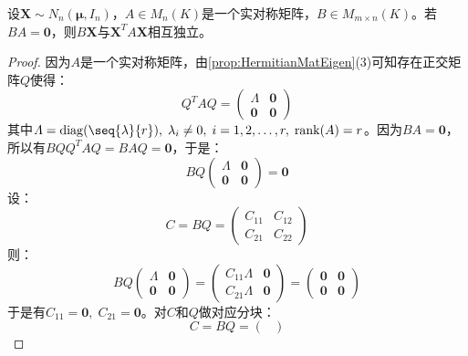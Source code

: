 \begin{theorem}\label{theo:BXXAXIndependent}
	设$\mathbf{X}\sim N_n(\boldsymbol{\mu},I_n)$，$A\in M_{n}(K)$是一个实对称矩阵，$B\in M_{m\times n}(K)$。若$BA=\mathbf{0}$，则$B\mathbf{X}$与$\mathbf{X}^TA\mathbf{X}$相互独立。
\end{theorem}
\begin{proof}
	因为$A$是一个实对称矩阵，由\cref{prop:HermitianMatEigen}(3)可知存在正交矩阵$Q$使得：
	\begin{equation*}
		Q^TAQ=
		\begin{pmatrix}
			\varLambda & \mathbf{0} \\
			\mathbf{0} & \mathbf{0}
		\end{pmatrix}
	\end{equation*}
	其中$\varLambda=\operatorname{diag}(\seq{\lambda}{r}),\;\lambda_i\ne0,\;i=1,2,\dots,r,\;\operatorname{rank}(A)=r$。因为$BA=\mathbf{0}$，所以有$BQQ^TAQ=BAQ=\mathbf{0}$，于是：
	\begin{equation*}
		BQ
		\begin{pmatrix}
			\varLambda & \mathbf{0} \\
			\mathbf{0} & \mathbf{0}
		\end{pmatrix}
		=\mathbf{0}
	\end{equation*}
	设：
	\begin{equation*}
		C=BQ=
		\begin{pmatrix}
			C_{11} & C_{12} \\
			C_{21} & C_{22}
		\end{pmatrix}
	\end{equation*}
	则：
	\begin{equation*}
		BQ
		\begin{pmatrix}
			\varLambda & \mathbf{0} \\
			\mathbf{0} & \mathbf{0}
		\end{pmatrix}
		=
		\begin{pmatrix}
			C_{11}\varLambda & \mathbf{0} \\
			C_{21}\varLambda & \mathbf{0}
		\end{pmatrix}
		=\begin{pmatrix}
			\mathbf{0} & \mathbf{0} \\
			\mathbf{0} & \mathbf{0}
		\end{pmatrix}
	\end{equation*}
	于是有$C_{11}=\mathbf{0},\;C_{21}=\mathbf{0}$。对$C$和$Q$做对应分块：
	\begin{equation*}
		C=BQ=
		\begin{pmatrix}

\end{pmatrix}
\end{equation*}
\end{proof}
